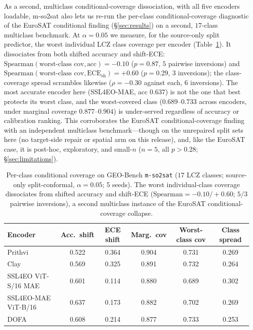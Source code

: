 \documentclass[11pt]{article}
\begin{document}
As a second, multiclass conditional-coverage dissociation, with all five encoders loadable, m-so2sat
also lets us re-run the per-class conditional-coverage diagnostic of the EuroSAT conditional finding
(\S\ref{sec:results}) on a second, $17$-class multiclass benchmark. At $\alpha{=}0.05$ we measure, for the
source-only split predictor, the worst individual LCZ class coverage per encoder (Table~\ref{tab:so2satcond}).
It dissociates from both shifted accuracy and shift-ECE:
$\mathrm{Spearman}(\text{worst-class cov},\text{acc})=-0.10$ ($p{=}0.87$, $5$ pairwise inversions) and
$\mathrm{Spearman}(\text{worst-class cov},\text{ECE}_{\mathrm{sh}})=+0.60$ ($p{=}0.29$, $3$ inversions);
the class-coverage spread scrambles likewise ($\rho=-0.30$ against each, $6$ inversions). The most accurate
encoder here (SSL4EO-MAE, acc $0.637$) is not the one that best protects its worst class, and the
worst-covered class ($0.689$--$0.733$ across encoders, under marginal coverage $0.877$--$0.904$) is
under-served regardless of accuracy or calibration ranking. This corroborates the EuroSAT
conditional-coverage finding with an independent multiclass benchmark---though on the unrepaired
split sets here (no target-side repair or spatial arm on this release), and, like the EuroSAT case, it is
post-hoc, exploratory, and small-$n$ ($n{=}5$, all $p>0.28$; \S\ref{sec:limitations}).

\begin{table}[t]\centering\small
\caption{Per-class conditional coverage on GEO-Bench \texttt{m-so2sat} ($17$ LCZ classes; source-only
split-conformal, $\alpha{=}0.05$; 5 seeds). The worst individual-class coverage dissociates from shifted
accuracy and shift-ECE ($\mathrm{Spearman}=-0.10/+0.60$; $5/3$ pairwise inversions), a second
multiclass instance of the EuroSAT conditional-coverage collapse.}\label{tab:so2satcond}
\begin{tabular}{lccccc}
\toprule
Encoder & Acc.\ shift & ECE shift & Marg.\ cov & Worst-class cov & Class spread \\
\midrule
Prithvi             & 0.522 & 0.364 & 0.904 & 0.731 & 0.269 \\
Clay                & 0.569 & 0.325 & 0.891 & 0.732 & 0.264 \\
SSL4EO ViT-S/16 MAE & 0.601 & 0.114 & 0.880 & 0.689 & 0.302 \\
SSL4EO-MAE ViT-B/16 & 0.637 & 0.173 & 0.882 & 0.702 & 0.269 \\
DOFA                & 0.608 & 0.214 & 0.877 & 0.733 & 0.253 \\
\bottomrule
\end{tabular}
\end{table}
\end{document}

